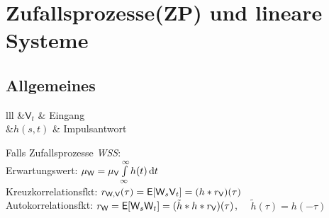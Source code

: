 \documentclass[german,color,6pt]{latex4ei/latex4ei_sheet}
\begin{document}
\section{Zufallsprozesse(ZP) und lineare Systeme}
\begin{sectionbox}
	\subsection{Allgemeines}
	
	
	\begin{tablebox}{lll}
		&$\textsf{V}_t$ & Eingang\\
		&$h(s,t)$ & Impulsantwort \\ 
		
	\end{tablebox}
	
	
	
	Falls Zufallsprozesse \emph{WSS}: \\
	Erwartungswert: $\mu_{\textsf{W}} = \mu_{\textsf{V}} \int\limits_{\infty}^{\infty} h(t) \diff t$\\
	Kreuzkorrelationsfkt: $r_{\textsf{W},\textsf{V}}(\tau) = \operatorname{\textsf{E}} [\textsf{W}_s \textsf{V}_t] =  (h * r_{\textsf{V}})(\tau)$\\
	Autokorrelationsfkt: $r_{\textsf{W}} = \operatorname{\textsf{E}} [\textsf{W}_s \textsf{W}_t] = (\tilde h * h * r_{\textsf{V}})(\tau)$, $\quad \tilde h (\tau) = h(-\tau)$
\end{sectionbox}
\end{document}
